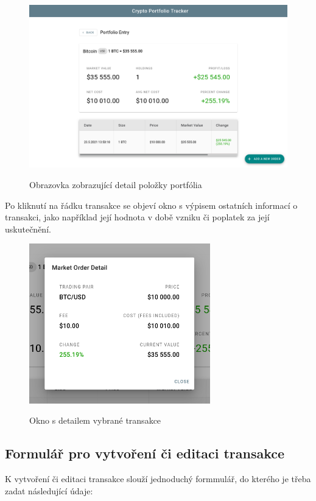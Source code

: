 \documentclass[12pt, a4paper]{article}
\begin{document}
    \begin{figure}[!ht]
        \centering
        {\includegraphics[width=\textwidth]{img/cpt-screenshots/portfolio-entry-detail.png}}
        \caption{Obrazovka zobrazující detail položky portfólia}
        \label{fig:entry-detail}
    \end{figure}
    
    Po kliknutí na řádku transakce se objeví okno s výpisem ostatních informací o transakci, jako například její hodnota
    v době vzniku či poplatek za její uskutečnění.
    
    \begin{figure}[!ht]
        \centering
        {\includegraphics[width=0.7\textwidth]{img/cpt-screenshots/portfolio-order-detail.png}}
        \caption{Okno s detailem vybrané transakce}
        \label{fig:transaction-detail}
    \end{figure}

    \newpage
    \subsection{Formulář pro vytvoření či editaci transakce}
    K vytvoření či editaci transakce slouží jednoduchý formmulář, do kterého je třeba zadat následující údaje:
    
\end{document}
